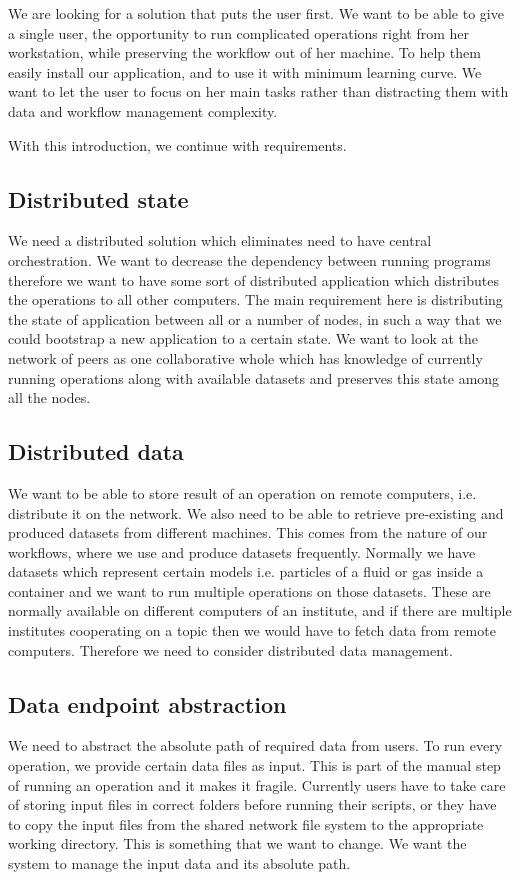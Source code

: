 We are looking for a solution that puts the user first.
We want to be able to give a single user, the opportunity to run complicated operations right
from her workstation, while preserving the workflow out of her machine.
To help them easily install our application, and to use it with minimum learning curve.
We want to let the user to focus on her main tasks rather than distracting them with 
data and workflow management complexity.

With this introduction, we continue with requirements.

\subsection{Distributed state}
We need a distributed solution which eliminates need to have central orchestration.
We want to decrease the dependency between running programs therefore we want to have 
some sort of distributed application which distributes the operations to all other computers.
The main requirement here is distributing the state of application between all or a number of nodes, 
in such a way that we could bootstrap a new application to a certain state.
We want to look at the network of peers as one collaborative whole which has knowledge of currently running
operations along with available datasets and preserves this state among all the nodes.

\subsection{Distributed data}
We want to be able to store result of an operation on remote computers, 
i.e. distribute it on the network. 
We also need to be able to retrieve pre-existing and produced datasets from different machines.
This comes from the nature of our workflows, where we use and produce datasets frequently. 
Normally we have datasets which represent certain models i.e.
particles of a fluid or gas inside a container and we want to run multiple operations on those datasets. 
These are normally available on different computers of an institute, and if there are multiple institutes cooperating
on a topic then we would have to fetch data from remote computers. 
Therefore we need to consider distributed data management.

\subsection{Data endpoint abstraction}
We need to abstract the absolute path of required data from users. To run every operation,
we provide certain data files as input. This is part of the manual step of running an operation and
it makes it fragile. Currently users have to take care of storing input files in correct folders before
running their scripts, or they have to copy the input files from the shared network file system to the
appropriate working directory. 
This is something that we want to change. 
We want the system to manage the input data and its absolute path.

